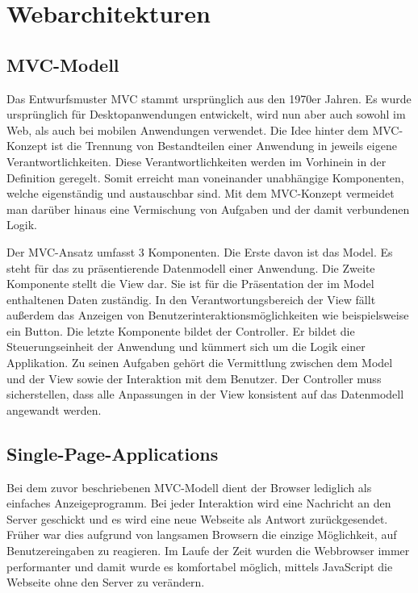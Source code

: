 \section{Webarchitekturen}

\subsection{MVC-Modell}

Das Entwurfsmuster MVC stammt ursprünglich aus den 1970er Jahren. Es wurde ursprünglich für Desktopanwendungen entwickelt, wird nun aber auch sowohl im Web, als auch bei mobilen Anwendungen verwendet. Die Idee hinter dem MVC-Konzept ist die Trennung von Bestandteilen einer Anwendung in jeweils eigene Verantwortlichkeiten. Diese Verantwortlichkeiten werden im Vorhinein in der Definition geregelt. Somit erreicht man voneinander unabhängige Komponenten, welche eigenständig und austauschbar sind. Mit dem MVC-Konzept vermeidet man darüber hinaus eine Vermischung von Aufgaben und der damit verbundenen Logik.

Der MVC-Ansatz umfasst 3 Komponenten. Die Erste davon ist das Model. Es steht für das zu präsentierende Datenmodell einer Anwendung. Die Zweite Komponente stellt die View dar. Sie ist für die Präsentation der im Model enthaltenen Daten zuständig. In den Verantwortungsbereich der View fällt außerdem das Anzeigen von Benutzerinteraktionsmöglichkeiten wie beispielsweise ein Button. Die letzte Komponente bildet der Controller. Er bildet die Steuerungseinheit der Anwendung und kümmert sich um die Logik einer Applikation. Zu seinen Aufgaben gehört die Vermittlung zwischen dem Model und der View sowie der Interaktion mit dem Benutzer. Der Controller muss sicherstellen, dass alle Anpassungen in der View konsistent auf das Datenmodell angewandt werden.

\subsection{Single-Page-Applications}

Bei dem zuvor beschriebenen MVC-Modell dient der Browser lediglich als einfaches Anzeigeprogramm. Bei jeder Interaktion wird eine Nachricht an den Server geschickt und es wird eine neue Webseite als Antwort zurückgesendet. Früher war dies aufgrund von langsamen Browsern die einzige Möglichkeit, auf Benutzereingaben zu reagieren. Im Laufe der Zeit wurden die Webbrowser immer performanter und damit wurde es komfortabel möglich, mittels JavaScript die Webseite ohne den Server zu verändern. 

